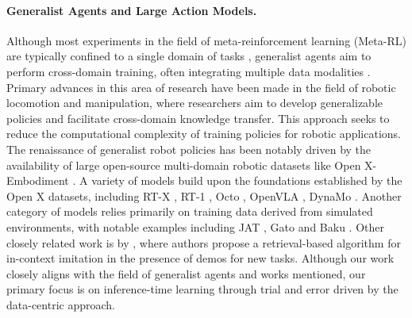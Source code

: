 \documentclass{article}
\theoremstyle{plain}
\theoremstyle{definition}
\theoremstyle{remark}
\begin{document}
\paragraph{Generalist Agents and Large Action Models.} Although most experiments in the field of meta-reinforcement learning (Meta-RL) are typically confined to a single domain of tasks \cite{DBLP:journals/corr/DuanSCBSA16, anand2021proceduralgeneralizationplanningselfsupervised, laskin2022incontextreinforcementlearningalgorithm}, generalist agents aim to perform cross-domain training, often integrating multiple data modalities \cite{gallouédec2024jacktradesmastersome, reed2022generalistagent}. Primary advances in this area of research have been made in the field of robotic locomotion and manipulation, where researchers aim to develop generalizable policies and facilitate cross-domain knowledge transfer. This approach seeks to reduce the computational complexity of training policies for robotic applications. The renaissance of generalist robot policies has been notably driven by the availability of large open-source multi-domain robotic datasets like Open X-Embodiment \cite{embodimentcollaboration2024openxembodimentroboticlearning}. A variety of models build upon the foundations established by the Open X datasets, including RT-X \cite{embodimentcollaboration2024openxembodimentroboticlearning}, RT-1 \cite{brohan2023rt1roboticstransformerrealworld}, Octo \cite{octomodelteam2024octoopensourcegeneralistrobot}, OpenVLA \cite{kim2024openvlaopensourcevisionlanguageactionmodel}, DynaMo \cite{cui2024dynamoindomaindynamicspretraining}. Another category of models relies primarily on training data derived from simulated environments, with notable examples including JAT \cite{gallouédec2024jacktradesmastersome}, Gato \cite{reed2022generalistagent} and Baku \cite{haldar2024bakuefficienttransformermultitask}. Other closely related work is by \citet{sridhar2024regent}, where authors propose a retrieval-based algorithm for in-context imitation in the presence of demos for new tasks. Although our work closely aligns with the field of generalist agents and works mentioned, our primary focus is on inference-time learning through trial and error driven by the data-centric approach.
\end{document}
